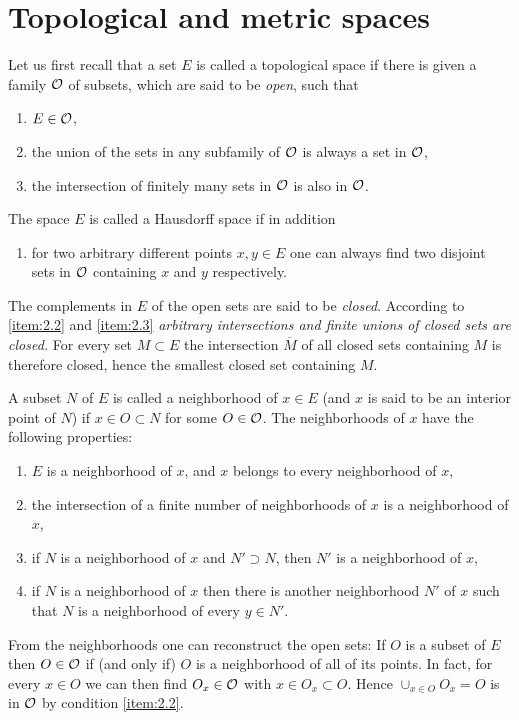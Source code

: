 \section{Topological and metric spaces}
Let us first recall that a set $E$ is called a topological space if
there is given a family $\mathcal{O}$ of subsets, which are said to be
\emph{open}, such that 
\begin{enumerate}[label=\alph*),itemindent=!,leftmargin=0pt]
\item\label{item:2.1} $E\in\mathcal{O}$,
\item\label{item:2.2} the union of the sets in any subfamily of $\mathcal{O}$ is always a set in $\mathcal{O}$,
\item\label{item:2.3} the intersection of finitely many sets in $\mathcal{O}$ is also in $\mathcal{O}$.
\end{enumerate}
The space $E$ is called a Hausdorff space if in addition
\begin{enumerate}[resume*]
\item\label{item:2.4} for two arbitrary different points $x,y\in E$ one can always
  find two disjoint sets in $\mathcal{O}$ containing $x$ and $y$ respectively.
\end{enumerate}\par
The complements in $E$ of the open sets are said to be
\emph{closed}. According to \ref{item:2.2} and \ref{item:2.3}
\emph{arbitrary intersections and finite unions of closed sets are
  closed.} For every set $M\subset E$ the intersection $\overline{M}$
of all closed sets containing $M$ is therefore closed, hence the
smallest closed set containing $M$.

A subset $N$ of $E$ is called a neighborhood of $x\in E$ (and $x$ is
said to be an interior point of $N$) if $x\in O\subset N$ for some
$O\in\mathcal{O}$. The neighborhoods of $x$ have the following properties:
\begin{enumerate}[label=\roman*),itemindent=!]
\item\label{item:2.5} $E$ is a neighborhood of $x$, and $x$ belongs to
  every neighborhood of $x$,
\item\label{item:2.6} the intersection of a finite number of
  neighborhoods of $x$ is a neighborhood of $x$,
\item\label{item:2.7} if $N$ is a neighborhood of $x$ and $N'\supset
  N$, then $N'$ is a neighborhood of $x$,
\item\label{item:2.8} if $N$ is a neighborhood of $x$ then there is
  another neighborhood $N'$ of $x$ such that $N$ is a neighborhood of
  every $y\in N'$.
\end{enumerate}
From the neighborhoods one can reconstruct the open sets: If $O$ is a
subset of $E$ then $O\in\mathcal{O}$ if (and only if) $O$ is a neighborhood of
all of its points. In fact, for every $x\in O$ we can then find
$O_x\in\mathcal{O}$ with $x\in O_x\subset O$. Hence $\cup_{x\in O}O_x=O$ is in
$\mathcal{O}$ by condition \ref{item:2.2}.

